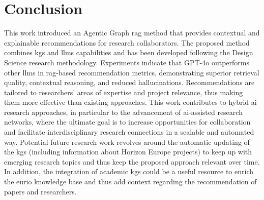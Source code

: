 \chapter{Conclusion}\label{chap:conclusion}
This work introduced an Agentic Graph \gls{rag} method that provides contextual and explainable recommendations for research collaborators.
The proposed method combines \glspl{kg} and \glspl{llm} capabilities and has been developed following the Design Science research methodology.
Experiments indicate that GPT-4o outperforms other \glspl{llm} in \gls{rag}-based recommendation metrics, demonstrating superior retrieval quality, contextual reasoning, and reduced hallucinations.
Recommendations are tailored to researchers' areas of expertise and project relevance, thus making them more effective than existing approaches. 
This work contributes to hybrid \gls{ai} research approaches, in particular to the advancement of \gls{ai}-assisted research networks, where the ultimate goal is to increase opportunities for collaboration and facilitate interdisciplinary research connections in a scalable and automated way.
Potential future research work revolves around the automatic updating of the \glspl{kg} (including information about Horizon Europe projects) to keep up with emerging research topics and thus keep the proposed approach relevant over time.
In addition, the integration of academic \glspl{kg} could be a useful resource to enrich the \gls{eurio} knowledge base and thus add context regarding the recommendation of papers and researchers.